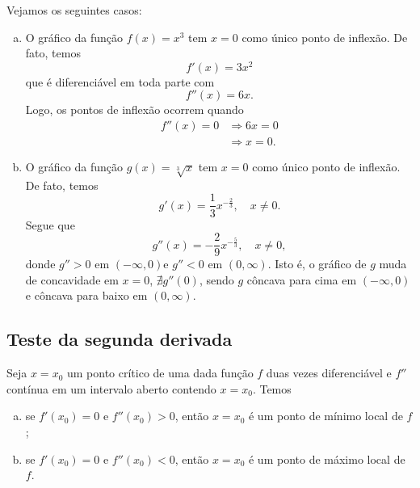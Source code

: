 \begin{ex}
  Vejamos os seguintes casos:
  \begin{enumerate}[a)]
  \item O gráfico da função $f(x) = x^3$ tem $x=0$ como único ponto de inflexão. De fato, temos
    \begin{equation}
      f'(x) = 3x^2
    \end{equation}
    que é diferenciável em toda parte com
    \begin{equation}
      f''(x) = 6x.
    \end{equation}
    Logo, os pontos de inflexão ocorrem quando
    \begin{align}
      f''(x) = 0 &\Rightarrow 6x = 0 \\
                 &\Rightarrow x = 0.
    \end{align}
  \item O gráfico da função $g(x) = \sqrt[3]{x}$ tem $x=0$ como único ponto de inflexão. De fato, temos
    \begin{equation}
      g'(x) = \frac{1}{3}x^{-\frac{2}{3}},\quad x\neq 0.
    \end{equation}
    Segue que
    \begin{equation}
      g''(x) = -\frac{2}{9}x^{-\frac{5}{3}},\quad x\neq 0,
    \end{equation}
    donde $g'' > 0$ em $(-\infty, 0)$e $g'' < 0$ em $(0, \infty)$. Isto é, o gráfico de $g$ muda de concavidade em $x=0$, $\nexists g''(0)$, sendo $g$ côncava para cima em $(-\infty, 0)$ e côncava para baixo em $(0, \infty)$.
\end{enumerate}
\end{ex}

\subsection{Teste da segunda derivada}

Seja $x=x_0$ um ponto crítico de uma dada função $f$ duas vezes diferenciável e $f''$ contínua em um intervalo aberto contendo $x=x_0$. Temos
\begin{enumerate}[a)]
\item se $f'(x_0) = 0$ e $f''(x_0) > 0$, então $x=x_0$ é um ponto de mínimo local de $f$;
\item se $f'(x_0) = 0$ e $f''(x_0) < 0$, então $x=x_0$ é um ponto de máximo local de $f$.
\end{enumerate}


